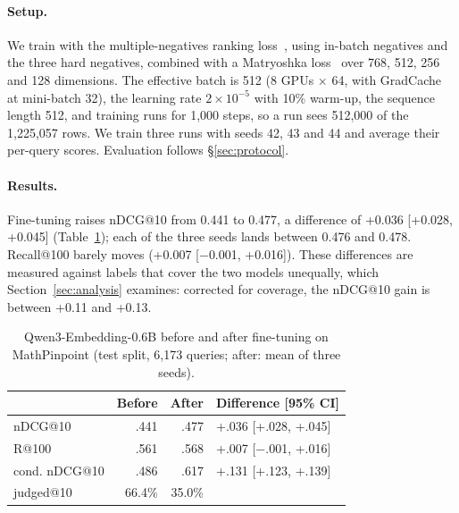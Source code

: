 \paragraph{Setup.}
We train with the multiple-negatives ranking loss~\citep{henderson2017smartreply}, using in-batch negatives and the three hard negatives, combined with a Matryoshka loss~\citep{kusupati2022matryoshka} over 768, 512, 256 and 128 dimensions. The effective batch is 512 (8 GPUs $\times$ 64, with GradCache~\citep{gao2021gradcache} at mini-batch 32), the learning rate $2\times10^{-5}$ with 10\% warm-up, the sequence length 512, and training runs for 1,000 steps, so a run sees 512,000 of the 1,225,057 rows. We train three runs with seeds 42, 43 and 44 and average their per-query scores. Evaluation follows \S\ref{sec:protocol}.

\paragraph{Results.}
Fine-tuning raises nDCG@10 from 0.441 to 0.477, a difference of +0.036 [+0.028, +0.045] (Table~\ref{tab:finetune}); each of the three seeds lands between 0.476 and 0.478. Recall@100 barely moves (+0.007 [$-$0.001, +0.016]). These differences are measured against labels that cover the two models unequally, which Section~\ref{sec:analysis} examines: corrected for coverage, the nDCG@10 gain is between +0.11 and +0.13.

\begin{table}[t]
\centering
\small
\setlength{\tabcolsep}{4pt}
\begin{tabular}{lrrl}
\toprule
 & Before & After & Difference [95\% CI] \\
\midrule
nDCG@10 & .441 & .477 & +.036 [+.028, +.045] \\
R@100 & .561 & .568 & +.007 [$-$.001, +.016] \\
cond. nDCG@10 & .486 & .617 & +.131 [+.123, +.139] \\
judged@10 & 66.4\% & 35.0\% & \\
\bottomrule
\end{tabular}
\caption{Qwen3-Embedding-0.6B before and after fine-tuning on MathPinpoint (test split, 6,173 queries; after: mean of three seeds).}
\label{tab:finetune}
\end{table}
